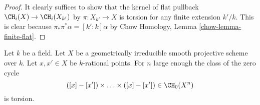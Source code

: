 \begin{proof}
It clearly suffices to show that the kernel
of flat pullback $\CH_i(X) \to \CH_i(X_{k'})$
by $\pi : X_{k'} \to X$ is torsion
for any finite extension $k'/k$. This is clear because
$\pi_* \pi^* \alpha = [k' : k] \alpha$ by
Chow Homology, Lemma \ref{chow-lemma-finite-flat}.
\end{proof}

\begin{lemma}[Voevodsky]
\label{lemma-smash-nilpotence}
\begin{reference}
\cite{nilpotence}
\end{reference}
Let $k$ be a field. Let $X$ be a geometrically irreducible
smooth projective scheme over $k$. Let $x, x' \in X$ be $k$-rational points.
For $n$ large enough the class of the zero cycle
$$
([x] - [x']) \times \ldots \times ([x] - [x']) \in
\CH_0(X^n)
$$
is torsion.
\end{lemma}

